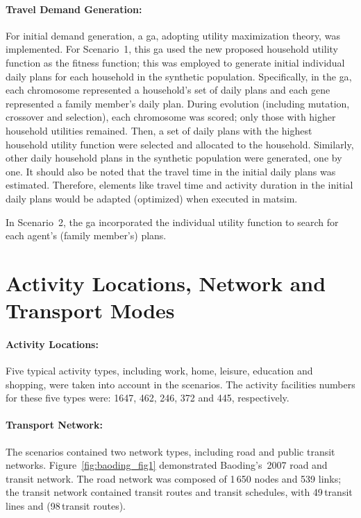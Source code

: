 \paragraph{Travel Demand Generation:}
For initial demand generation, a \gls{ga}, adopting utility maximization theory, was implemented. 
For Scenario~1, this \gls{ga} used the new proposed household utility function as the fitness function; this was employed to generate initial individual daily plans for each household in the synthetic population. 
Specifically, in the \gls{ga}, each chromosome represented a household's set of daily plans and each gene represented a family member's daily plan. 
During evolution (including mutation, crossover and selection), each chromosome was scored; only those with higher household utilities remained. 
Then, a set of daily plans with the highest household utility function were selected and allocated to the household. 
Similarly, other daily household plans in the synthetic population were generated, one by one. 
It should also be noted that the travel time in the initial daily plans was estimated. 
Therefore, elements like travel time and activity duration in the initial daily plans would be adapted (optimized) when executed in \gls{matsim}.

In Scenario~2, the \gls{ga} incorporated the individual utility function to search for each agent's (family member's) plans.

\section{Activity Locations, Network and Transport Modes}
\paragraph{Activity Locations:} Five typical activity types, including work, home, leisure, education and shopping, were taken into account in the scenarios. 
The activity facilities numbers for these five types were: 1647, 462, 246, 372 and 445, respectively. 

\paragraph{Transport Network:} The scenarios contained two network types, including road and public transit networks. 
Figure~\ref{fig:baoding_fig1} demonstrated Baoding's~2007 road and transit network. The road network was composed of 1\,650 nodes and 539 links; the transit network contained transit routes and transit schedules, with  49\,transit lines and (98\,transit routes). 

